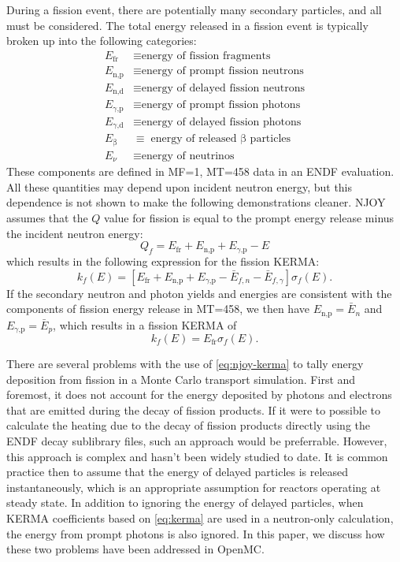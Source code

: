 \documentclass{anstrans}
\newcommand{\efr}{E_\text{fr}}
\newcommand{\enp}{E_\text{n,p}}
\newcommand{\ened}{E_\text{n,d}}
\newcommand{\egp}{E_\text{$\gamma$,p}}
\newcommand{\egd}{E_\text{$\gamma$,d}}
\newcommand{\eb}{E_\upbeta}
\newcommand{\enu}{E_\nu}
\begin{document}
During a fission event, there are potentially many secondary particles, and all
must be considered. The total energy released in a fission event is typically
broken up into the following categories:
\begin{equation*}
\begin{split}
  \efr  &\equiv \text{energy of fission fragments} \\
  \enp  &\equiv \text{energy of prompt fission neutrons} \\
  \ened &\equiv \text{energy of delayed fission neutrons} \\
  \egp  &\equiv \text{energy of prompt fission photons} \\
  \egd  &\equiv \text{energy of delayed fission photons} \\
  \eb   &\equiv \text{energy of released $\upbeta$ particles} \\
  \enu  &\equiv \text{energy of neutrinos}
\end{split}
\end{equation*}
These components are defined in MF=1, MT=458 data in an ENDF evaluation. All
these quantities may depend upon incident neutron energy, but this dependence is
not shown to make the following demonstrations cleaner. NJOY assumes that the
$Q$ value for fission is equal to the prompt energy release minus the incident
neutron energy:
\begin{equation}
    \label{eq:njoy-fissq}
    Q_f = \efr + \enp + \egp - E
\end{equation}
which results in the following expression for the fission KERMA:
\begin{equation}
    k_f(E) = \left[\efr + \enp + \egp - \bar{E}_{f,n} - \bar{E}_{f,\gamma}\right]\sigma_f(E).
\end{equation}
If the secondary neutron and photon yields and energies are consistent with the
components of fission energy release in MT=458, we then have $\enp = \bar{E}_n$
and $\egp = \bar{E}_p$, which results in a fission KERMA of
\begin{equation}
    \label{eq:njoy-kerma}
    k_f(E) = \efr \sigma_f(E).
\end{equation}

There are several problems with the use of \cref{eq:njoy-kerma} to tally energy
deposition from fission in a Monte Carlo transport simulation. First and
foremost, it does not account for the energy deposited by photons and electrons
that are emitted during the decay of fission products. If it were to possible to
calculate the heating due to the decay of fission products directly using the
ENDF decay sublibrary files, such an approach would be preferrable. However,
this approach is complex and hasn't been widely studied to date. It is common
practice then to assume that the energy of delayed particles is released
instantaneously, which is an appropriate assumption for reactors operating at
steady state. In addition to ignoring the energy of delayed particles, when
KERMA coefficients based on \cref{eq:kerma} are used in a neutron-only
calculation, the energy from prompt photons is also ignored. In this paper, we
discuss how these two problems have been addressed in OpenMC.
\end{document}
